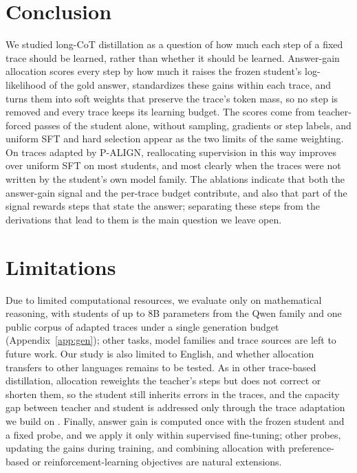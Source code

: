 \documentclass[11pt]{article}
\begin{document}
\section{Conclusion}

We studied long-CoT distillation as a question of how much each step of a fixed trace should be learned, rather than whether it should be learned.
Answer-gain allocation scores every step by how much it raises the frozen student's log-likelihood of the gold answer, standardizes these gains within each trace, and turns them into soft weights that preserve the trace's token mass, so no step is removed and every trace keeps its learning budget.
The scores come from teacher-forced passes of the student alone, without sampling, gradients or step labels, and uniform SFT and hard selection appear as the two limits of the same weighting.
On traces adapted by P-ALIGN, reallocating supervision in this way improves over uniform SFT on most students, and most clearly when the traces were not written by the student's own model family.
The ablations indicate that both the answer-gain signal and the per-trace budget contribute, and also that part of the signal rewards steps that state the answer; separating these steps from the derivations that lead to them is the main question we leave open.

\section*{Limitations}

Due to limited computational resources, we evaluate only on mathematical reasoning, with students of up to 8B parameters from the Qwen family and one public corpus of adapted traces under a single generation budget (Appendix~\ref{app:gen}); other tasks, model families and trace sources are left to future work.
Our study is also limited to English, and whether allocation transfers to other languages remains to be tested.
As in other trace-based distillation, allocation reweights the teacher's steps but does not correct or shorten them, so the student still inherits errors in the traces, and the capacity gap between teacher and student is addressed only through the trace adaptation we build on \citep{liu2026palign}.
Finally, answer gain is computed once with the frozen student and a fixed probe, and we apply it only within supervised fine-tuning; other probes, updating the gains during training, and combining allocation with preference-based or reinforcement-learning objectives are natural extensions.
\end{document}

